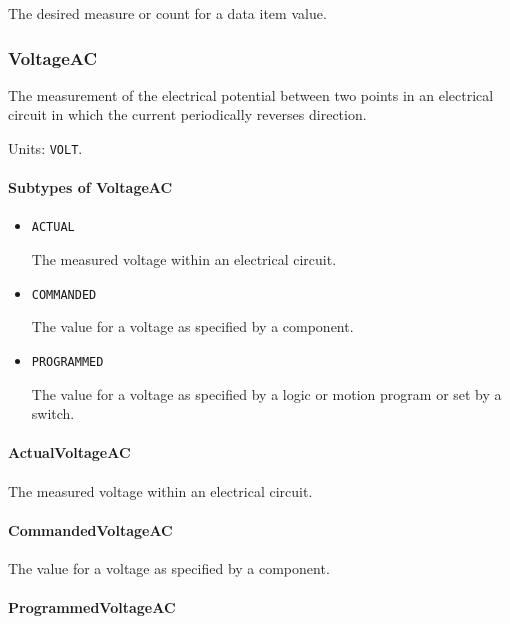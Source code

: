 The desired measure or count for a data item value.


\subsubsection{VoltageAC}
\label{sec:VoltageAC}



The measurement of the electrical potential between two points in an electrical circuit in which the current periodically reverses direction.


Units: \texttt{VOLT}.

\paragraph{Subtypes of VoltageAC}\mbox{}
\label{sec:Subtypes of VoltageAC}

\begin{itemize}

\item \texttt{ACTUAL}


The measured voltage within an electrical circuit.

\item \texttt{COMMANDED}


The value for a voltage as specified by a  component.

\item \texttt{PROGRAMMED}


The value for a voltage as specified by a logic or motion program or set by a switch.


\end{itemize}

\paragraph{ActualVoltageAC}\mbox{}
\label{sec:ActualVoltageAC}


The measured voltage within an electrical circuit.


\paragraph{CommandedVoltageAC}\mbox{}
\label{sec:CommandedVoltageAC}


The value for a voltage as specified by a  component.


\paragraph{ProgrammedVoltageAC}\mbox{}
\label{sec:ProgrammedVoltageAC}


